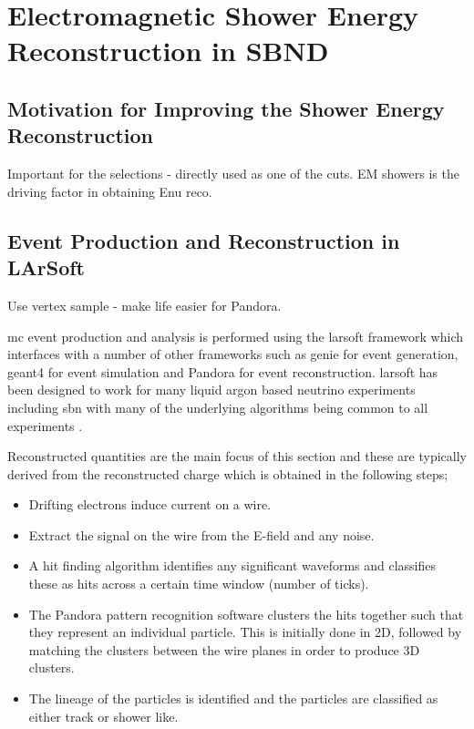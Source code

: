 \chapter{Electromagnetic Shower Energy Reconstruction in SBND}
\label{chap:Energy_Reco}
\section{Motivation for Improving the Shower Energy Reconstruction}

Important for the selections - directly used as one of the cuts. 
EM showers is the driving factor in obtaining Enu reco.


\section{Event Production and Reconstruction in LArSoft}\label{sec:Event Production and Reconstruction in LArSoft}

Use vertex sample - make life easier for Pandora.

\gls{mc} event production and analysis is performed using the \gls{larsoft} framework which interfaces with a number of other frameworks such as \gls{genie} for event generation, \gls{geant4} for event simulation and Pandora for event reconstruction. \gls{larsoft} has been designed to work for many liquid argon based neutrino experiments including \gls{sbn} with many of the underlying algorithms being common to all experiments \cite{larsoft}\cite{larsoft_paper}.

Reconstructed quantities are the main focus of this section and these are typically derived from the reconstructed charge which is obtained in the following steps;
\begin{itemize}
    \item Drifting electrons induce current on a wire.
    \item Extract the signal on the wire from the E-field and any noise. 
    \item A hit finding algorithm identifies any significant waveforms and classifies these as hits across a certain time window (number of ticks). 
    \item The Pandora pattern recognition software clusters the hits together such that they represent an individual particle. This is initially done in 2D, followed by matching the clusters between the wire planes in order to produce 3D clusters.
    \item The lineage of the particles is identified and the particles are classified as either track or shower like.
\end{itemize}

